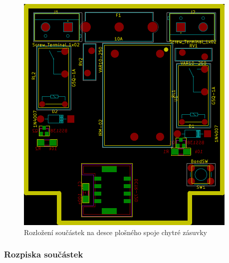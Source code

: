 \documentclass[12pt,a4paper,oneside]{article}
\begin{document}
\begin{figure}[H]
\centering
\label{fig:components}
\includegraphics{img/kicad/components.pdf}
\caption{Rozložení součástek na desce plošného spoje chytré zásuvky}
\end{figure}

\newpage

\subsubsection{Rozpiska součástek}
\end{document}
